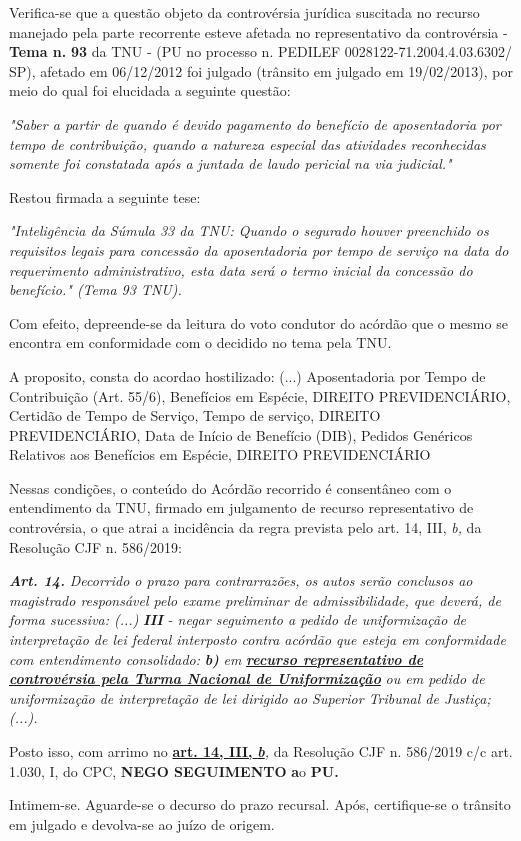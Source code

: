 \documentclass[12pt]{article}
\begin{document}
\justifying
\noindent Verifica-se que a questão objeto da controvérsia jurídica suscitada no recurso manejado pela parte recorrente esteve afetada no representativo da controvérsia - \textbf{Tema n. }\textbf{93} da TNU - (PU no processo n. PEDILEF 0028122-71.2004.4.03.6302/ SP),  afetado em 06/12/2012 foi julgado (trânsito em julgado em 19/02/2013), por meio do qual foi elucidada a seguinte questão:

\noindent \textit{"Saber a partir de quando é devido pagamento do benefício de aposentadoria por tempo de contribuição, quando a natureza especial das atividades reconhecidas somente foi constatada após a juntada de laudo pericial na via judicial."}

\noindent Restou firmada a seguinte tese:

\noindent \textit{"Inteligência da Súmula 33 da TNU: Quando o segurado houver preenchido os requisitos legais para concessão da aposentadoria por tempo de serviço na data do requerimento administrativo, esta data será o termo inicial da concessão do benefício." (Tema 93 TNU).}

\noindent Com efeito, depreende-se da leitura do voto condutor do acórdão que o mesmo se encontra em conformidade com o decidido no  tema pela TNU.

\noindent A proposito, consta do acordao hostilizado: (...) Aposentadoria por Tempo de Contribuição (Art. 55/6), Benefícios em Espécie, DIREITO PREVIDENCIÁRIO, Certidão de Tempo de Serviço, Tempo de serviço, DIREITO PREVIDENCIÁRIO, Data de Início de Benefício (DIB), Pedidos Genéricos Relativos aos Benefícios em Espécie, DIREITO PREVIDENCIÁRIO

\noindent Nessas condições, o conteúdo do Acórdão recorrido é consentâneo com o entendimento da TNU, firmado em julgamento de recurso representativo de controvérsia, o que atrai a incidência da regra prevista pelo art. 14, III, \textit{b,} da Resolução CJF n. 586/2019:

\noindent \textit{\textbf{Art. 14.}}\textit{ Decorrido o prazo para contrarrazões, os autos serão conclusos ao magistrado responsável pelo exame preliminar de admissibilidade, que deverá, de forma sucessiva: (...) }\textit{\textbf{III }}\textit{- negar seguimento a pedido de uniformização de interpretação de lei federal interposto contra acórdão que esteja em conformidade com entendimento consolidado: }\textit{\textbf{b)}}\textit{ em }\uline{\textit{\textbf{recurso representativo de controvérsia pela Turma Nacional de Uniformização}}}\textit{ ou em pedido de uniformização de interpretação de lei dirigido ao Superior Tribunal de Justiça;(...).}

\noindent Posto isso, com arrimo no \uline{\textbf{art. 14, III, }}\uline{\textit{\textbf{b}}}\textit{,} da Resolução CJF n. 586/2019 c/c art. 1.030, I, do CPC, \textbf{NEGO SEGUIMENTO }\textbf{a}o\textbf{ PU}\textbf{.}

\noindent Intimem-se. Aguarde-se o decurso do prazo recursal. Após, certifique-se o trânsito em julgado e devolva-se ao juízo de origem.
\end{document}
